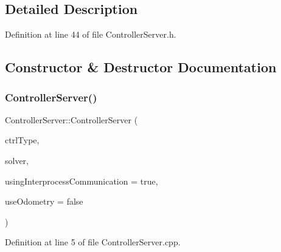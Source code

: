 \subsection{Detailed Description}


Definition at line 44 of file Controller\+Server.\+h.



\subsection{Constructor \& Destructor Documentation}
\hypertarget{classocra__recipes_1_1ControllerServer_a78cc49b2b2a3f9daecc0662051b5644d}{}\label{classocra__recipes_1_1ControllerServer_a78cc49b2b2a3f9daecc0662051b5644d} 
\subsubsection{\texorpdfstring{Controller\+Server()}{ControllerServer()}}
{\footnotesize\ttfamily Controller\+Server\+::\+Controller\+Server (\begin{DoxyParamCaption}\item[{\hyperlink{namespaceocra__recipes_ae561cff4ea9a191b8b1ebb4e69a1a4ba}{C\+O\+N\+T\+R\+O\+L\+L\+E\+R\+\_\+\+T\+Y\+PE}}]{ctrl\+Type,  }\item[{\hyperlink{namespaceocra__recipes_afb3bb4de56c2b9472c80d746eb13fed3}{S\+O\+L\+V\+E\+R\+\_\+\+T\+Y\+PE}}]{solver,  }\item[{bool}]{using\+Interprocess\+Communication = {\ttfamily true},  }\item[{bool}]{use\+Odometry = {\ttfamily false} }\end{DoxyParamCaption})}



Definition at line 5 of file Controller\+Server.\+cpp.

\hypertarget{classocra__recipes_1_1ControllerServer_a02157f0e6432dae6d8ebf3126c335444}{}\label{classocra__recipes_1_1ControllerServer_a02157f0e6432dae6d8ebf3126c335444} 
